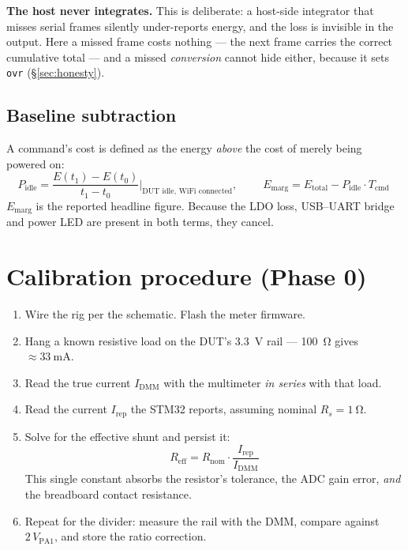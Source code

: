 \documentclass[11pt,a4paper]{article}
\begin{document}
\medskip
\noindent
\textbf{The host never integrates.} This is deliberate: a host-side integrator that misses serial
frames silently under-reports energy, and the loss is invisible in the output. Here a missed frame
costs nothing --- the next frame carries the correct cumulative total --- and a missed
\emph{conversion} cannot hide either, because it sets \texttt{ovr} (\S\ref{sec:honesty}).

\subsection{Baseline subtraction}

A command's cost is defined as the energy \emph{above} the cost of merely being powered on:
\[
P_\text{idle} = \frac{E(t_1) - E(t_0)}{t_1 - t_0}\bigg|_\text{DUT idle, WiFi connected},
\qquad
\boxed{\;E_\text{marg} = E_\text{total} - P_\text{idle}\cdot T_\text{cmd}\;}
\]
$E_\text{marg}$ is the reported headline figure. Because the LDO loss, USB--UART bridge and
power LED are present in both terms, they cancel.

\section{Calibration procedure (Phase 0)}
\label{sec:cal}

\noindent{}

\medskip
\begin{enumerate}[leftmargin=*]
  \item Wire the rig per the schematic. Flash the meter firmware.
  \item Hang a known resistive load on the DUT's \SI{3.3}{\volt} rail --- \SI{100}{\ohm}
        gives $\approx\SI{33}{\milli\ampere}$.
  \item Read the true current $I_\text{DMM}$ with the multimeter \emph{in series} with that load.
  \item Read the current $I_\text{rep}$ the STM32 reports, assuming nominal $R_s = \SI{1}{\ohm}$.
  \item Solve for the effective shunt and persist it:
        \[ R_\text{eff} = R_\text{nom}\cdot\frac{I_\text{rep}}{I_\text{DMM}} \]
        This single constant absorbs the resistor's tolerance, the ADC gain error, \emph{and}
        the breadboard contact resistance.
  \item Repeat for the divider: measure the rail with the DMM, compare against
        $2\,V_\text{PA1}$, and store the ratio correction.
\end{enumerate}
\end{document}
